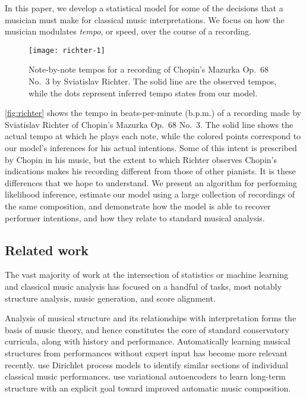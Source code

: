 \documentclass[12pt]{article}
\begin{document}
In this paper, we develop a statistical model for some of the
decisions that a musician must make for classical music
interpretations. We focus on how the musician modulates
{\it tempo}, or speed, over the course of a recording. 
\begin{figure}[t]
  \centering
  \texttt{[image: richter-1]}
  \caption{Note-by-note tempos for a recording of Chopin's Mazurka
    Op.\ 68 No.\ 3 by Sviatislav Richter. The solid line are the
    observed tempos, while the dots represent inferred tempo states
    from our model. }
  \label{fig:richter}
\end{figure}
\autoref{fig:richter} shows the tempo in beats-per-minute (b.p.m.) of
a recording made by Sviatislav Richter of Chopin's Mazurka Op.\ 68
No.\ 3. The solid line shows the actual tempo at which he plays each
note, while the colored points correspond to our model's inferences
for his actual intentions. Some of this intent is prescribed  by
Chopin in his music, but the extent to which Richter observes Chopin's
indications makes his recording different from those of other
pianists. It is these differences that we hope to understand.
We present an algorithm for
performing likelihood inference, estimate our model using a large
collection of recordings of the same composition, and demonstrate how
the model is able to recover performer intentions, and how they relate
to standard musical analysis.

\subsection{Related work}
\label{sec:related-work}


 
The vast majority of work at the intersection of statistics or machine
learning and classical music analysis has focused on a handful of tasks,
most notably structure analysis, music generation, and score
alignment.

Analysis of musical structure and its relationships with interpretation
forms the basis of music theory, and hence constitutes the core of standard
conservatory curricula, along with history and performance. Automatically learning musical structures
from performances without expert input has become more relevant
recently. \citet{RenDunson2010} use Dirichlet process models to identify
similar sections of individual classical music
performances. \citet{RobertsEngel2018} use variational autoencoders to
learn long-term structure with an explicit goal toward improved
automatic music composition.
\end{document}
